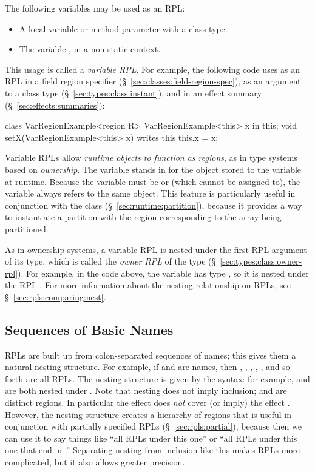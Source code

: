 The following variables may be used as an RPL:
%
\begin{itemize}
%
\item A  local variable or method parameter with a class
  type.
%
\item The variable , in a non-static context.
%
\end{itemize}
%
This usage is called a \emph{variable RPL}.  For example, the
following code uses  as an RPL in a field region specifier
(\S~\ref{sec:classes:field-region-spec}), as an argument to a class
type (\S~\ref{sec:types:class:instant}), and in an effect summary
(\S~\ref{sec:effects:summaries}):
%
\begin{dpjlisting}
class VarRegionExample<region R> {
    VarRegionExample<this> x in this;
    void setX(VarRegionExample<this> x) writes this {
        this.x = x;
    }
}
\end{dpjlisting}
%

Variable RPLs allow \emph{runtime objects to function as regions}, as
in type systems based on \emph{ownership}.  The variable stands in for
the object stored to the variable at runtime.  Because the variable
must be  or  (which cannot be assigned to), the
variable always refers to the same object.  This feature is
particularly useful in conjunction with the  class
(\S~\ref{sec:runtime:partition}), because it provides a way to
instantiate a partition with the region corresponding to the array
being partitioned.

As in ownership systems, a variable RPL is nested under the first RPL
argument of its type, which is called the \emph{owner RPL} of the type
(\S~\ref{sec:types:class:owner-rpl}).  For example, in the code above,
the variable  has type , so it is
nested under the RPL .  For more information about the nesting
relationship on RPLs, see \S~\ref{sec:rpls:comparing:nest}.


\subsection{Sequences of Basic Names%
\label{sec:rpls:sequences}}

RPLs are built up from colon-separated sequences of names; this gives
them a natural nesting structure.  For example, if  and 
are names, then , , , , ,
and so forth are all RPLs.  The nesting structure is given by the
syntax: for example,  and  are both nested under
.  Note that nesting does not imply inclusion;  and
 are distinct regions.  In particular the effect  does \emph{not} cover (or imply) the effect .
However, the nesting structure creates a hierarchy of regions that is
useful in conjunction with partially specified RPLs
(\S~\ref{sec:rpls:partial}), because then we can use it to say things
like ``all RPLs under this one'' or ``all RPLs under this one that end
in .''  Separating nesting from inclusion like this makes RPLs
more complicated, but it also allows greater precision.

